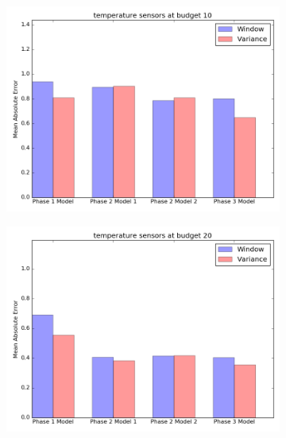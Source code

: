 \documentclass{article}
\begin{document}
\newpage

\begin{figure}[h!]
	\begin{subfigure}{\linewidth}
	\includegraphics[scale=0.5]{temperature_10_final.png}
	\end{subfigure}
	\begin{subfigure}{\linewidth}
	\includegraphics[scale=0.5]{temperature_20_final.png}
	\end{subfigure}
\end{figure}

\newpage
\end{document}
